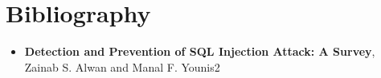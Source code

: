 \documentclass{article}
\begin{document}
\section*{Bibliography} 
\begin{itemize}
	\item \textbf{Detection and Prevention of SQL Injection Attack: A Survey}, Zainab S. Alwan and Manal F. Younis2
\end{itemize}
\end{document}
